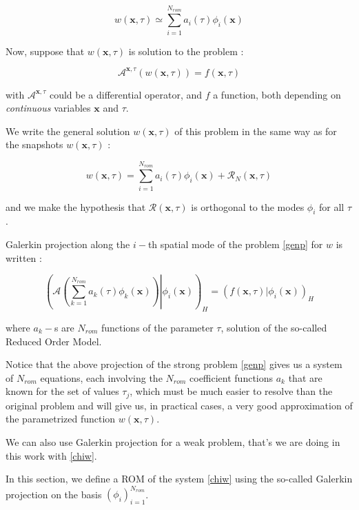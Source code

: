 \begin{equation}
w(\mathbf{x},\tau)\simeq\sum\limits_{i=1}^{N_{rom}} a_i(\tau)\phi_i(\mathbf{x})
\end{equation}

Now, suppose that $w(\mathbf{x},\tau)$ is solution to the problem :

\begin{equation}\label{genp}
\mathcal{A}^{\mathbf{x},\tau}\left(w(\mathbf{x},\tau)\right)=f(\mathbf{x},\tau)
\end{equation}

with $\mathcal{A}^{\mathbf{x},\tau}$ could be a differential operator, %
and $f$ a function, both depending on \emph{continuous} variables $\mathbf{x}$ and $\tau$.

\par
We write the general solution $w(\mathbf{x},\tau)$ of this problem in the same way as for the snapshots $w(\mathbf{x},\tau)$ :

\[w(\mathbf{x},\tau)=\sum\limits_{i=1}^{N_{rom}} a_i(\tau)\phi_i(\mathbf{x})+\mathcal{R}_N(\mathbf{x},\tau)\]

and we make the hypothesis that $\mathcal{R}(\mathbf{x},\tau)$ is orthogonal to the modes $\phi_i$ for all $\tau$.

\par
Galerkin projection along the $i-$th spatial mode of the problem \ref{genp} for $w$ is written :

\[%
\left(\left.\mathcal{A}\left(\sum\limits_{k=1}^{N_{rom}} a_k(\tau)\phi_k(\mathbf{x})\right) \right|\phi_i\left(\mathbf{x}\right)\right)_H %
= \left(f\left(\mathbf{x},\tau\right)|\phi_i(\mathbf{x})\right)_H%
\]

where $a_k-$s are $N_{rom}$ functions of the parameter $\tau$, solution of the so-called Reduced Order Model.

\par
Notice that the above projection of the strong problem \ref{genp} gives us a system of $N_{rom}$ equations, each involving the $N_{rom}$ coefficient functions $a_k$ %
that are known for the set of values $\tau_j$, which must be much easier to resolve than the original problem and will give us, %
in practical cases, a very good approximation of the parametrized function $w(\mathbf{x},\tau)$.

\par
We can also use Galerkin projection for a weak problem, that's we are doing in this work with \ref{chiw}.

\etoile
In this section, we define a ROM of the system \ref{chiw} using the so-called Galerkin projection on the basis $(\phi_i)_{i=1}^{N_{rom}}$.

